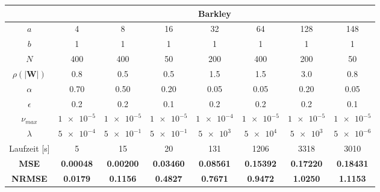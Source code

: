 \begin{table}[h]
	\centering

	\begin{tabular}{|c|c|c|c|c|c|c|c|}
		\multicolumn{1}{c|}{} & \multicolumn{7}{c|}{Barkley}\\ 
		\hline \hline 
		\rule[-1ex]{0pt}{2.5ex} $a$ & 4 & 8 & 16 & 32 & 64 & 128 & 148\\ 
		\hline 
		\rule[-1ex]{0pt}{2.5ex} $b$ & 1 & 1 & 1 & 1 & 1 & 1 & 1 \\ 
		\hline 
		\rule[-1ex]{0pt}{3.5ex} $N$ & 400 & 400 & 50 & 200 & 400 & 200 & 50\\ 
		\hline 
		\rule[-1ex]{0pt}{3.5ex} $\rho(|\mathbf{W}|)$ & 0.8 & 0.5 & 0.5 & 1.5 & 1.5 & 3.0 & 0.8\\ 
		\hline 
		\rule[-1ex]{0pt}{3.5ex} $\alpha$ & 0.70 & 0.50 & 0.20 & 0.05 & 0.05 & 0.20 & 0.05 \\ 
		\hline 
		\rule[-1ex]{0pt}{3.5ex} $\epsilon$ & 0.2 & 0.2 & 0.1 & 0.2 & 0.2 & 0.2 & 0.1 \\ 
		\hline 
		\rule[-1ex]{0pt}{3.5ex} $\nu_{max}$ & $\num{1e-5}$ & $\num{1e-5}$ & $\num{1e-5}$ & $\num{1e-4}$ & $\num{1e-5}$ & $\num{1e-5}$ &  $\num{1e-5}$\\ 
		\hline 
		\rule[-1ex]{0pt}{3.5ex} $\lambda$ & $\num{5e-4}$ & $\num{5e-1}$ & $\num{5e-1}$ & $\num{5e+3}$ & $\num{5e+4}$ & $\num{5e+3}$ & $\num{5e-6}$\\ 		
		\hline 
		\rule[-1ex]{0pt}{2.5ex} Laufzeit [s] & 5 & 15 & 20 & 131 & 1206 & 3318 & 3010\\
		\hline 
		\rule[-1ex]{0pt}{2.5ex} \textbf{MSE} & \textbf{0.00048} & \textbf{0.00200} & \textbf{0.03460} & \textbf{0.08561} & \textbf{0.15392} & \textbf{0.17220} & \textbf{0.18431}\\ 
		\hline 
		\rule[-1ex]{0pt}{2.5ex} \textbf{NRMSE} & \textbf{0.0179} & \textbf{0.1156} & \textbf{0.4827} & \textbf{0.7671} & \textbf{0.9472} & \textbf{1.0250} & \textbf{1.1153} \\ 
		\hline 
	\end{tabular} 
	
	\vspace{0.75cm}

	\centering


\end{table}
